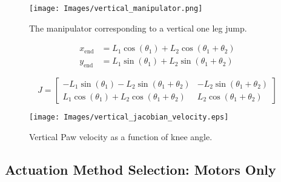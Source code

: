 \begin{figure}[h]
    \centering
    \texttt{[image: Images/vertical\_manipulator.png]}
    \caption{The manipulator corresponding to a vertical one leg jump.}
    \label{fig:vertical_manipulator}
\end{figure}

\begin{equation}
    \label{eq:2_link_manipulator}
    \begin{aligned}
        x_{\text{end}} &= L_1 \cos(\theta_1) + L_2 \cos(\theta_1 + \theta_2) \\
        y_{\text{end}} &= L_1 \sin(\theta_1) + L_2 \sin(\theta_1 + \theta_2)
    \end{aligned}
\end{equation}

\begin{equation*}
    \label{eq:jacobian_vertical_jump_leg}
    J = \begin{bmatrix} 
    -L_1 \sin(\theta_1) - L_2 \sin(\theta_1 + \theta_2) & -L_2 \sin(\theta_1 + \theta_2) \\
    L_1 \cos(\theta_1) + L_2 \cos(\theta_1 + \theta_2) & L_2 \cos(\theta_1 + \theta_2)
    \end{bmatrix}
\end{equation*}

\begin{figure}[h]
    \centering
    \texttt{[image: Images/vertical\_jacobian\_velocity.eps]}
    \caption{Vertical Paw velocity as a function of knee angle.}
    \label{fig:vertical_jacobian_velocity}
\end{figure}

\subsection{Actuation Method Selection: Motors Only}
\label{sec:design_motor_only_jumps}
\begin{comment}
johanih@NTNU27686 MINGW64 ~/Documents/git/simscape_prosjektoppgave ((97ce13f...))
$ git log
commit 97ce13ff6832ea927897df16743914b9defbcdbf (HEAD)
Author: Johannes Ihle <johanih@ntnu.no>
Date:   Tue Oct 15 15:41:56 2024 +0200

    Updated everything according to status when sent message to Kostas
\end{comment} 

